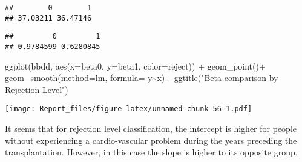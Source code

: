 \documentclass[
]{article}
\newenvironment{Shaded}{\begin{snugshade}}{\end{snugshade}}
\newcommand{\AttributeTok}[1]{\textcolor[rgb]{0.77,0.63,0.00}{#1}}
\newcommand{\FunctionTok}[1]{\textcolor[rgb]{0.00,0.00,0.00}{#1}}
\newcommand{\NormalTok}[1]{#1}
\newcommand{\OtherTok}[1]{\textcolor[rgb]{0.56,0.35,0.01}{#1}}
\newcommand{\SpecialCharTok}[1]{\textcolor[rgb]{0.00,0.00,0.00}{#1}}
\newcommand{\StringTok}[1]{\textcolor[rgb]{0.31,0.60,0.02}{#1}}
\begin{document}
\begin{Shaded}
\end{Shaded}

\begin{verbatim}
##        0        1 
## 37.03211 36.47146
\end{verbatim}

\begin{Shaded}
\end{Shaded}

\begin{verbatim}
##         0         1 
## 0.9784599 0.6280845
\end{verbatim}

\begin{Shaded}
\begin{Highlighting}[]
\FunctionTok{ggplot}\NormalTok{(bbdd, }\FunctionTok{aes}\NormalTok{(}\AttributeTok{x=}\NormalTok{beta0, }\AttributeTok{y=}\NormalTok{beta1, }\AttributeTok{color=}\NormalTok{reject)) }\SpecialCharTok{+} \FunctionTok{geom\_point}\NormalTok{()}\SpecialCharTok{+}
  \FunctionTok{geom\_smooth}\NormalTok{(}\AttributeTok{method=}\StringTok{\textquotesingle{}lm\textquotesingle{}}\NormalTok{, }\AttributeTok{formula=}\NormalTok{ y}\SpecialCharTok{\textasciitilde{}}\NormalTok{x)}\SpecialCharTok{+}
\FunctionTok{ggtitle}\NormalTok{(}\StringTok{"Beta comparison by Rejection Level"}\NormalTok{)}
\end{Highlighting}
\end{Shaded}

\texttt{[image: Report\_files/figure-latex/unnamed-chunk-56-1.pdf]}

It seems that for rejection level classification, the intercept is
higher for people without experiencing a cardio-vascular problem during
the years preceding the transplantation. However, in this case the slope
is higher to its opposite group.
\end{document}
